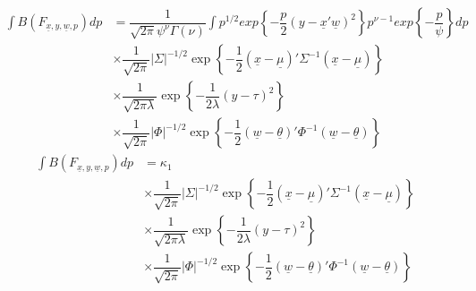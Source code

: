 \documentclass[fleqn]{minimal}
\begin{document}
\begin{align*}
  \int B\left(F_{\underline{x}, y, \underline{w}, p}\right) dp
  & = \dfrac{1}{\sqrt{2\pi}\psi^\nu \Gamma(\nu)}
  \int p^{1/2}
  exp
  \left\{
    - \dfrac{p}{2}
    \left( y - \underline{x}'\underline{w} \right)^2
  \right\}
  p^{\nu-1}
  exp
  \left\{
    - \dfrac{p}{\psi}
  \right\}
  dp \\ 
  & \times
  \dfrac{1}{\sqrt{2\pi}}
  \left| \Sigma \right|^{-1/2}
  \exp
  \left\{
    - \dfrac{1}{2}
    \left( \underline{x} - \underline{\mu}\right)'
    \Sigma^{-1}
    \left( \underline{x} - \underline{\mu}\right)
  \right\} \\
  & \times
  \dfrac{1}{\sqrt{2\pi\lambda}}
  \exp
  \left\{
    - \dfrac{1}{2\lambda}
    \left(y - \tau\right)^2
  \right\} \\
  & \times
  \dfrac{1}{\sqrt{2\pi}}
  \left| \Phi \right|^{-1/2}
  \exp
  \left\{
    - \dfrac{1}{2}
    \left( \underline{w} - \underline{\theta}\right)'
    \Phi^{-1}
    \left( \underline{w} - \underline{\theta}\right)
  \right\}
\end{align*}
\begin{align*}
  \int B\left(F_{\underline{x}, y, \underline{w}, p}\right) dp
  & = \kappa_1 \\ 
  & \times
  \dfrac{1}{\sqrt{2\pi}}
  \left| \Sigma \right|^{-1/2}
  \exp
  \left\{
    - \dfrac{1}{2}
    \left( \underline{x} - \underline{\mu}\right)'
    \Sigma^{-1}
    \left( \underline{x} - \underline{\mu}\right)
  \right\} \\
  & \times
  \dfrac{1}{\sqrt{2\pi\lambda}}
  \exp
  \left\{
    - \dfrac{1}{2\lambda}
    \left(y - \tau\right)^2
  \right\} \\
  & \times
  \dfrac{1}{\sqrt{2\pi}}
  \left| \Phi \right|^{-1/2}
  \exp
  \left\{
    - \dfrac{1}{2}
    \left( \underline{w} - \underline{\theta}\right)'
    \Phi^{-1}
    \left( \underline{w} - \underline{\theta}\right)
  \right\}
\end{align*}
\end{document}
